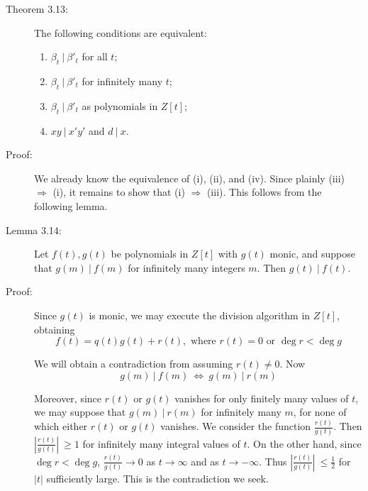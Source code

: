 \begin{description}

  \item[Theorem 3.13:] The following conditions are equivalent:
    \begin{enumerate}[\hspace{1cm}(i)]
      \item $\beta_{t}\ |\ \beta'_{t}$ for all $t$;
      \item $\beta_{t}\ |\ \beta'_{t}$ for infinitely many $t$;
      \item $\beta_{t}\ |\ \beta'_{t}$ as polynomials in $Z[t]$;
      \item $xy\ |\ x' y'$ and $d\ |\ x$.
    \end{enumerate}

  \item[Proof:] We already know the equivalence of (i), (ii), and (iv). Since plainly (iii) $\Rightarrow$ (i), it remains to show that (i) $\Rightarrow$ (iii). This follows from the following lemma.

  \item[Lemma 3.14:] Let $f(t), g(t)$ be polynomials in $Z[t]$ with $g(t)$ monic, and suppose that $g(m)\ |\ f(m)$ for infinitely many integers $m$. Then $g(t)\ |\ f(t)$.

  \item[Proof:] Since $g(t)$ is monic, we may execute the division algorithm in $Z[t]$, obtaining
    \begin{equation*}
    f(t) = q(t)g(t) + r(t), \text{ where } r(t) = 0 \text{ or } \deg r < \deg g
    \end{equation*}

    We will obtain a contradiction from assuming $r(t) \neq 0$. Now 
    \begin{equation*}
    g(m)\ |\ f(m)\ \Longleftrightarrow\ g(m)\ |\ r(m)
    \end{equation*}

    Moreover, since $r(t)$ or $g(t)$ vanishes for only finitely many values of $t$, we may suppose that $g(m)\ |\ r(m)$ for infinitely many $m$, for none of which either $r(t)$ or $g(t)$ vanishes. We consider the function $\frac{r(t)}{g(t)}$. Then $\left| \frac{r(t)}{g(t)} \right|\ \geq 1$ for infinitely many integral values of $t$. On the other hand, since $\deg r < \deg g$, $\frac{r(t)}{g(t)} \to 0$ as $t \to \infty$ and as $t \to -\infty$. Thus $\left| \frac{r(t)}{g(t)} \right|\ \leq \frac{1}{2}$ for $|t|$ sufficiently large. This is the contradiction we seek.


\end{description}
